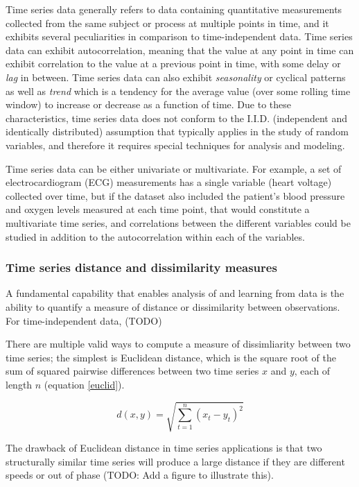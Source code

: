 \documentclass[12pt, letterpaper]{article}
\begin{document}
Time series data generally refers to data containing quantitative measurements
collected from the same subject or process at multiple points in time, and it
exhibits several peculiarities in comparison to time-independent data.  Time
series data can exhibit autocorrelation, meaning that the value at any point in
time can exhibit correlation to the value at a previous point in time, with some
delay or \emph{lag} in between. Time series data can also exhibit
\emph{seasonality} or cyclical patterns as well as \emph{trend} which is a
tendency for the average value (over some rolling time window) to increase or
decrease as a function of time. Due to these characteristics, time series data
does not conform to the I.I.D. (independent and identically distributed)
assumption that typically applies in the study of random variables, and
therefore it requires special techniques for analysis and modeling.

Time series data can be either univariate or multivariate. For example, a set of
electrocardiogram (ECG) measurements has a single variable (heart voltage)
collected over time, but if the dataset also included the patient's blood
pressure and oxygen levels measured at each time point, that would constitute a
multivariate time series, and correlations between the different variables could
be studied in addition to the autocorrelation within each of the variables.

\subsubsection{Time series distance and dissimilarity measures}

A fundamental capability that enables analysis of and learning from data is the
ability to quantify a measure of distance or dissimilarity between observations.
For time-independent data, (TODO)

There are multiple valid ways to compute a measure of dissimliarity between two
time series; the simplest is Euclidean distance, which is the square root of the
sum of squared pairwise differences between two time series $x$ and $y$, each of
length $n$ (equation \ref{euclid}).

\begin{equation} \label{euclid}
d(x, y) = \sqrt{\sum_{t=1}^{n}(x_t-y_t)^2}
\end{equation}

The drawback of Euclidean distance in time series applications is that two
structurally similar time series will produce a large distance if they are
different speeds or out of phase (TODO: Add a figure to illustrate this).
\end{document}
